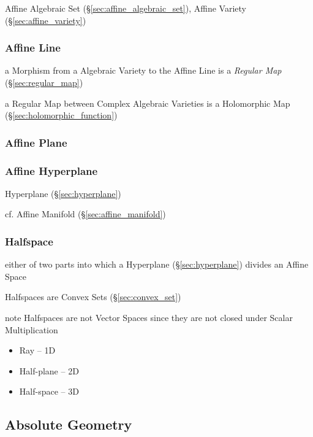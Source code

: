 \fist Affine Algebraic Set (\S\ref{sec:affine_algebraic_set}), Affine Variety
(\S\ref{sec:affine_variety})



\subsubsection{Affine Line}\label{sec:affine_line}

a Morphism from a Algebraic Variety to the Affine Line is a \emph{Regular Map}
(\S\ref{sec:regular_map})

a Regular Map between Complex Algebraic Varieties is a Holomorphic Map
(\S\ref{sec:holomorphic_function})



\subsubsection{Affine Plane}\label{sec:affine_plane}

\subsubsection{Affine Hyperplane}\label{sec:affine_hyperplane}

Hyperplane (\S\ref{sec:hyperplane})

cf. Affine Manifold (\S\ref{sec:affine_manifold})



\subsubsection{Halfspace}\label{sec:halfspace}

either of two parts into which a Hyperplane (\S\ref{sec:hyperplane}) divides an
Affine Space

Halfspaces are Convex Sets (\S\ref{sec:convex_set})

note Halfspaces are not Vector Spaces since they are not closed under Scalar
Multiplication

\begin{itemize}
  \item Ray -- 1D
  \item Half-plane -- 2D
  \item Half-space -- 3D
\end{itemize}



\subsection{Absolute Geometry}\label{sec:absolute_geometry}

